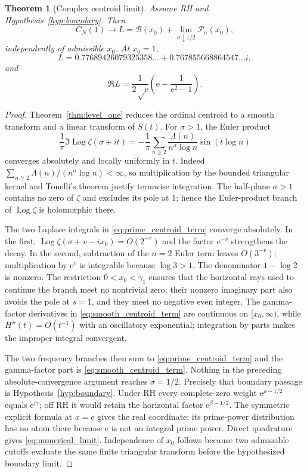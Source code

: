 \documentclass[11pt]{amsart}
\newtheorem{theorem}{Theorem}[section]
\theoremstyle{definition}
\theoremstyle{remark}
\newcommand{\ee}{\mathrm e}
\newcommand{\Log}{\operatorname{Log}}
\begin{document}
\begin{theorem}[Complex centroid limit]\label{thm:complex_centroid}
Assume RH and Hypothesis~\ref{hyp:boundary}.  Then
\begin{equation}\label{eq:complex_limit}
C_N(1)\longrightarrow L
=\mathcal B(x_0)+\lim_{\sigma\downarrow1/2}\mathcal P_\sigma(x_0),
\end{equation}
independently of admissible $x_0$.  At $x_0=1$,
\begin{equation}\label{eq:numerical_limit}
L=0.77689426079325358\ldots
+0.767855668864547\ldots i,
\end{equation}
and
\begin{equation}\label{eq:real_limit_closed}
\Re L=\frac1{2\sqrt\ee}\left(\ee-\frac1{\ee^2-1}\right).
\end{equation}
\end{theorem}

\begin{proof}
Theorem~\ref{thm:level_one} reduces the ordinal centroid to a smooth transform
and a linear transform of $S(t)$.  For $\sigma>1$, the Euler product
\[
\frac1\pi\Im\Log\zeta(\sigma+it)
=-\frac1\pi\sum_{n\ge2}\frac{\Lambda(n)}{n^\sigma\log n}
\sin(t\log n)
\]
converges absolutely and locally uniformly in $t$.  Indeed
$\sum_{n\ge2}\Lambda(n)/(n^\sigma\log n)<\infty$, so multiplication by the
bounded triangular kernel and Tonelli's theorem justify termwise integration.
The half-plane $\sigma>1$ contains no zero of $\zeta$ and excludes its pole at
$1$; hence the Euler-product branch of $\Log\zeta$ is holomorphic there.

The two Laplace integrals in \eqref{eq:prime_centroid_term} converge
absolutely.  In the first, $\Log\zeta(\sigma+v-ix_0)=O(2^{-v})$ and the factor
$\ee^{-v}$ strengthens the decay.  In the second, subtraction of the $n=2$
Euler term leaves $O(3^{-v})$; multiplication by $\ee^v$ is integrable because
$\log3>1$.  The denominator $1-\log2$ is nonzero.  The restriction
$0<x_0<\gamma_1$ ensures that the horizontal rays used to continue the branch
meet no nontrivial zero; their nonzero imaginary part also avoids the pole at
$s=1$, and they meet no negative even integer.  The gamma-factor derivatives
in \eqref{eq:smooth_centroid_term} are continuous on $[x_0,\infty)$, while
$H''(t)=O(t^{-1})$ with an oscillatory exponential; integration by parts makes
the improper integral convergent.

The two frequency branches then sum to \eqref{eq:prime_centroid_term} and the
gamma-factor part is \eqref{eq:smooth_centroid_term}.  Nothing in the preceding
absolute-convergence argument reaches $\sigma=1/2$.  Precisely that boundary
passage is Hypothesis~\ref{hyp:boundary}.  Under RH every complete-zero weight
$\ee^{\rho-1/2}$ equals $\ee^{i\gamma}$; off RH it would retain the horizontal
factor $\ee^{\beta-1/2}$.  The symmetric explicit formula at $x=\ee$ gives the
real coordinate; its prime-power distribution has no atom there because
$\ee$ is not an integral prime power.  Direct quadrature gives
\eqref{eq:numerical_limit}.  Independence of $x_0$ follows because two
admissible cutoffs evaluate the same finite triangular transform before the
hypothesized boundary limit.
\end{proof}
\end{document}
